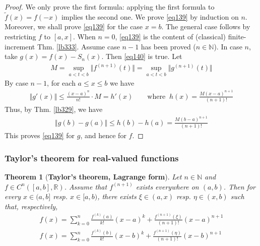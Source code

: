\documentclass[12pt,b5paper,notitlepage]{article}
\theoremstyle{definition}
\theoremstyle{plain}
\newtheorem{thm}[df]{Theorem}
\newcommand{\wtd}{\widetilde}
\newcommand{\Nbb}{\mathbb N}
\newcommand{\Rbb}{\mathbb R}
\numberwithin{equation}{section}
\begin{document}
\begin{proof}
We only prove the first formula: applying the first formula to $\wtd f(x)=f(-x)$ implies the second one. We prove \eqref{eq139} by induction on $n$. Moreover, we shall prove \eqref{eq139} for the case $x=b$. The general case follows by restricting $f$ to $[a,x]$.  When $n=0$, \eqref{eq139} is the content of (classical) finite-increment Thm. \ref{lb333}. Assume case $n-1$ has been proved ($n\in\Nbb$). In case $n$, take $g(x)=f(x)-S_n(x)$. Then \eqref{eq140} is true. Let
\begin{align*}
M=\sup_{a<t<b}\Vert f^{(n+1)}(t)\Vert =\sup_{a<t<b}\Vert g^{(n+1)}(t)\Vert
\end{align*}
By case $n-1$, for each $a\leq x\leq b$ we have
\begin{align*}
\Vert g'(x)\Vert \leq\frac{(x-a)^n}{n!}\cdot M=h'(x)\qquad\text{where }~h(x)=\frac{M(x-a)^{n+1}}{(n+1)!} 
\end{align*}
Thus, by Thm. \ref{lb329}, we have
\begin{align*}
\Vert g(b)-g(a)\Vert\leq h(b)-h(a)=\frac{M(b-a)^{n+1}}{(n+1)!} 
\end{align*}
This proves \eqref{eq139} for $g$, and hence for $f$.
\end{proof}



\subsubsection{Taylor's theorem for real-valued functions}



\begin{thm}[\textbf{Taylor's theorem, Lagrange form}]\label{lb395}
Let $n\in\Nbb$ and $f\in C^n([a,b],\Rbb)$. Assume that $f^{(n+1)}$ exists everywhere on $(a,b)$. Then for every $x\in(a,b]$ resp. $x\in[a,b)$, there exists $\xi\in(a,x)$ resp. $\eta\in (x,b)$ such that, respectively,
\begin{subequations}
\begin{gather}
f(x)=\sum_{k=0}^n\frac{f^{(k)}(a)}{k!}(x-a)^k+\frac{f^{(n+1)}(\xi)}{(n+1)!}(x-a)^{n+1}\label{eq141}\\
f(x)=\sum_{k=0}^n\frac{f^{(k)}(b)}{k!}(x-b)^k+\frac{f^{(n+1)}(\eta)}{(n+1)!}(x-b)^{n+1}
\end{gather}
\end{subequations}
\end{thm}
\end{document}

